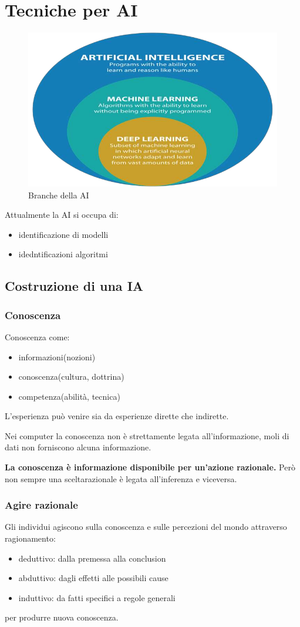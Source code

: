 \section{Tecniche per AI}
\begin{figure}[H]
    \centering
    \includegraphics[width=0.5\linewidth]{imgs/12 - campi dell'ai}
    \caption{Branche della AI}
    \label{fig:campi_ai}
\end{figure}

Attualmente la AI si occupa di:
\begin{itemize}
    \item identificazione di modelli
    \item idedntificazioni algoritmi
\end{itemize}


\subsection{Costruzione di una IA}
\subsubsection{Conoscenza}
Conoscenza come:
\begin{itemize}
    \item informazioni(nozioni)
    \item conoscenza(cultura, dottrina)
    \item competenza(abilità, tecnica)
\end{itemize}

L'esperienza può venire sia da esperienze dirette che indirette.

Nei computer la conoscenza non è strettamente legata all'informazione, moli di dati non forniscono 
alcuna informazione.

\textbf{La conoscenza è informazione disponibile per un'azione razionale.}
Però non sempre una sceltarazionale è legata all'inferenza e viceversa.

\subsubsection{Agire razionale}
Gli individui agiscono sulla conoscenza e sulle percezioni del mondo attraverso ragionamento:
\begin{itemize}
    \item deduttivo: dalla premessa alla conclusion
    \item abduttivo: dagli effetti alle possibili cause
    \item induttivo: da fatti specifici a regole generali
\end{itemize}
per produrre nuova conoscenza.

